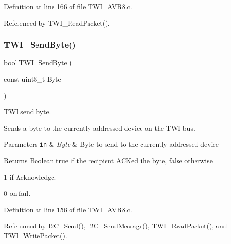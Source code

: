 Definition at line 166 of file T\+W\+I\+\_\+\+A\+V\+R8.\+c.



Referenced by T\+W\+I\+\_\+\+Read\+Packet().

\mbox{\label{group__Group__TWI__AVR8_ga57d8ffa11749c0ba97d52c2a6e246d65}} 
\subsubsection{\texorpdfstring{T\+W\+I\+\_\+\+Send\+Byte()}{TWI\_SendByte()}}
{\footnotesize\ttfamily \hyperlink{hardware_2user__config_8h_af6a258d8f3ee5206d682d799316314b1}{bool} T\+W\+I\+\_\+\+Send\+Byte (\begin{DoxyParamCaption}\item[{const uint8\+\_\+t}]{Byte }\end{DoxyParamCaption})}



T\+WI send byte. 

Sends a byte to the currently addressed device on the T\+WI bus.


\begin{DoxyParams}[1]{Parameters}
\mbox{\tt in}  & {\em Byte} & Byte to send to the currently addressed device\\
\hline
\end{DoxyParams}
\begin{DoxyReturn}{Returns}
Boolean {\ttfamily true} if the recipient A\+C\+Ked the byte, {\ttfamily false} otherwise

1 if Acknowledge. 

0 on fail. 
\end{DoxyReturn}


Definition at line 156 of file T\+W\+I\+\_\+\+A\+V\+R8.\+c.



Referenced by I2\+C\+\_\+\+Send(), I2\+C\+\_\+\+Send\+Message(), T\+W\+I\+\_\+\+Read\+Packet(), and T\+W\+I\+\_\+\+Write\+Packet().

\mbox{\label{group__Group__TWI__AVR8_ga5e9fac0280a2414490f628071c0073c2}} 
